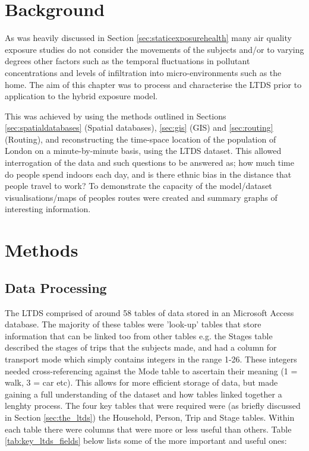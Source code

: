 \section{Background}
\label{sec:1_background}

As was heavily discussed in Section \ref{sec:staticexposurehealth} many air quality exposure studies do not consider the movements of the subjects and/or to varying degrees other factors such as the temporal fluctuations in pollutant concentrations and levels of infiltration into micro-environments such as the home. The aim of this chapter was to process and characterise the LTDS prior to application to the hybrid exposure model. 

This was achieved by using the methods outlined in Sections \ref{sec:spatialdatabases} (Spatial databases), \ref{sec:gis} (GIS) and \ref{sec:routing} (Routing), and reconstructing the time-space location of the population of London on a minute-by-minute basis, using the LTDS dataset. This allowed interrogation of the data and such questions to be answered as; how much time do people spend indoors each day, and is there ethnic bias in the distance that people travel to work? To demonstrate the capacity of the model/dataset visualisations/maps of peoples routes were created and summary graphs of interesting information.

\section{Methods}
\label{sec:1_methods}

\subsection{Data Processing}
\label{sec:reconstruction_data_processing}

The LTDS comprised of around 58 tables of data stored in an Microsoft Access database. The majority of these tables were 'look-up' tables that store information that can be linked too from other tables e.g. the Stages table described the stages of trips that the subjects made, and had a column for transport mode which simply contains integers in the range 1-26. These integers needed cross-referencing against the Mode table to ascertain their meaning (1 = walk, 3 = car etc). This allows for more efficient storage of data, but made gaining a full understanding of the dataset and how tables linked together a lenghty process. The four key tables that were required were (as briefly discussed in Section \ref{sec:the_ltds}) the Household, Person, Trip and Stage tables. Within each table there were columns that were more or less useful than others.  Table \ref{tab:key_ltds_fields} below lists some of the more important and useful ones:

